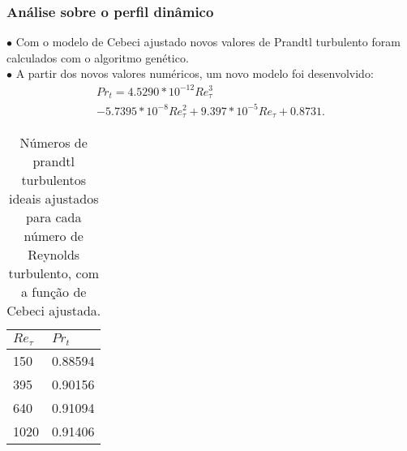 \documentclass[xcolor=dvipsnames,10pt,aspectratio=169]{beamer}
\begin{document}
    \begin{frame}
		\frametitle{Análise sobre o perfil dinâmico}
		\begin{minipage}[h!]{0.45\textwidth}
      $\bullet$ Com o modelo de Cebeci ajustado novos valores de Prandtl turbulento foram calculados com o algoritmo genético.\\
      $\bullet$ A partir dos novos valores numéricos, um novo modelo foi desenvolvido:\\

      \begin{equation}
        \begin{split}
          Pr_t = 4.5290 * 10^{-12} Re_\tau^3 \\
          - 5.7395 * 10^{-8} Re_\tau^2 + 9.397 * 10^{-5} Re_\tau + 0.8731.
        \end{split}
      \end{equation}

		\end{minipage}\hfill
		\begin{minipage}[h!]{0.45\textwidth}
      \begin{table}[!h]
        \centering
        \caption{Números de prandtl turbulentos ideais ajustados para cada número de Reynolds turbulento, com a função de Cebeci ajustada.}
        \begin{tabular}{ll}
          \hline
          $Re_\tau$ & $Pr_t$\\
          \hline
          150  &   0.88594\\
          395  &   0.90156\\
          640  &   0.91094\\
          1020 &   0.91406\\ 
          \hline
        \end{tabular}
      \end{table}

		\end{minipage}
		\end{frame}	
\end{document}
